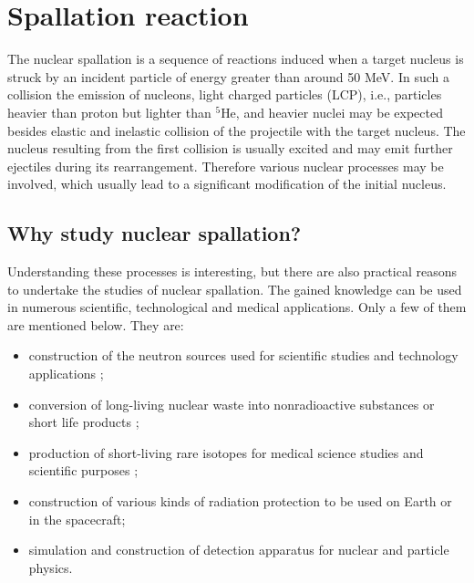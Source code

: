 \section{Spallation reaction}

The nuclear spallation is a sequence of reactions 
induced when a target nucleus is struck by an incident particle of energy greater than around 50 MeV. In such a collision the emission of nucleons, light charged particles (LCP), i.e., particles heavier than proton but lighter than $^5$He, and heavier nuclei may be expected besides elastic and inelastic collision of the projectile with the target nucleus. The nucleus resulting from the first collision is usually excited and may emit further ejectiles during its rearrangement. Therefore various nuclear processes may be involved, which usually lead to a significant modification of the initial nucleus.

\subsection{Why study nuclear spallation?}

Understanding these processes is interesting, but there are also practical reasons to undertake the studies of nuclear spallation. The gained knowledge can be used in  
numerous scientific, technological and medical applications. 
Only a few of them are mentioned below. They are:
\begin{itemize}
    \item construction of the neutron sources used for scientific studies and technology applications  \cite{carpenter1977pulsed};
    \item conversion of long-living nuclear waste into nonradioactive substances or short life products \cite{ravn98A};
    \item production of short-living rare isotopes for medical science studies \cite{bowman1992nuclear} and scientific purposes \cite{meneguzzi1971production};
    \item construction of various kinds of radiation protection to be used on Earth or in the spacecraft;
    \item simulation and construction of detection apparatus for nuclear and particle physics.
\end{itemize}

